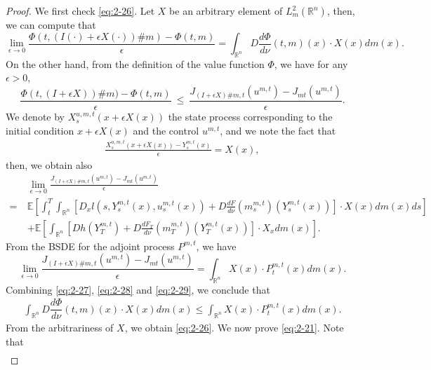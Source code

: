 \documentclass[11pt]{article}
\numberwithin{equation}{section}
\newcommand{\e}{\mathbb{E}}
\newcommand{\brn}{{\mathbb{R}^n}}
\newcommand{\1}{\mbox{1\hspace{-1mm}I}}
\begin{document}
\begin{proof}
We first check \eqref{eq:2-26}. Let $X$ be an arbitrary element of $L_{m}^{2}(\brn)$, then, we can compute that 
\begin{equation}
    \lim_{\epsilon\to 0} \dfrac{\Phi(t,(I(\cdot)+\epsilon X(\cdot))\#m)-\Phi(t,m)}{\epsilon}=\int_{\brn}D\frac{d\Phi}{d\nu}(t,m)(x)\cdot X(x) dm(x). \label{eq:2-27}
\end{equation}
On the other hand, from the definition of the value function $\Phi$, we have for any $\epsilon>0$,
\begin{equation}
    \dfrac{\Phi(t,(I+\epsilon X))\#m)-\Phi(t,m)}{\epsilon}\ \le\ \frac{J_{(I+\epsilon X)\#m,t}\left(u^{m,t}\right)-J_{mt}\left(u^{m,t}\right)}{\epsilon}. \label{eq:2-28}
\end{equation}
We denote by $X^{u,m,t}_s\left(x+\epsilon X(x)\right)$ the state process corresponding to the initial condition $x+\epsilon X(x)$ and the control $u^{m,t}$, and we note the fact that  
\begin{align*}
    \frac{X^{u,m,t}_s\left(x+\epsilon X(x)\right)-Y^{m,t}_s(x)}{\epsilon}=X(x),
\end{align*}
then, we obtain also 
\begin{align*}
    &\lim_{\epsilon\to 0} \frac{J_{(I+\epsilon X)\#m,t}\left(u^{m,t}\right)-J_{mt}\left(u^{m,t}\right)}{\epsilon}\\
    =\ & \e \left[\int_{t}^{T} \int_{\brn} \left[D_{x}l\left(s,Y^{m,t}_s(x),u^{m,t}_s(x)\right)+D\frac{dF}{d\nu}\left(m^{m,t}_s\right)\left(Y^{m,t}_s(x)\right)\right]\cdot X(x)dm(x)ds\right]\\
    &+\e\left[\int_{\brn}\left[Dh\left(Y^{m,t}_T\right)+D\frac{dF_T}{d\nu}\left(m^{m,t}_T\right)\left(Y^{m,t}_T(x)\right)\right]\cdot X_{x}dm(x)\right].
\end{align*}
From the BSDE for the adjoint process $P^{m,t}$, we have
\begin{equation}
    \lim_{\epsilon\to 0} \frac{J_{(I+\epsilon X)\#m,t}\left(u^{m,t}\right)-J_{mt}\left(u^{m,t}\right)}{\epsilon}=\int_{\brn}X(x)\cdot P^{m,t}_t(x)dm(x). \label{eq:2-29}
\end{equation}
Combining \eqref{eq:2-27}, \eqref{eq:2-28} and \eqref{eq:2-29}, we conclude that 
\begin{align*}
    \int_{\brn}D\dfrac{d\Phi}{d\nu}(t,m)(x)\cdot X(x)dm(x)\leq\int_{\brn}X(x)\cdot P^{m,t}_t(x)dm(x).
\end{align*}
From the arbitrariness of $X$, we obtain \eqref{eq:2-26}. We now prove \eqref{eq:2-21}. Note that
\begin{align}

\end{align}
\end{proof}
\end{document}
